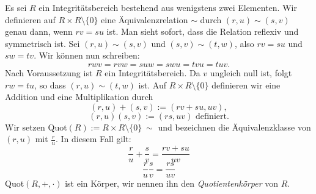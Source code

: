 \begin{satz}\label{quotkoerper} %
Es sei $R$ ein Integritätsbereich bestehend aus wenigstens zwei Elementen. Wir definieren auf $R\times R\setminus\lbrace 0\rbrace$ eine Äquivalenzrelation $\sim$ durch $\left(r,u\right) \sim \left(s, v\right)$ genau dann, wenn $rv = su$ ist. Man sieht sofort, dass die Relation reflexiv und symmetrisch ist. Sei $\left(r,u\right) \sim \left(s, v\right)$ und $ \left(s, v\right) \sim \left(t, w\right) $, also $rv = su$ und $sw = tv$. Wir können nun schreiben: \\
\[rwv = rvw = suw = swu = tvu = tuv.\]
Nach Voraussetzung ist $R$ ein Integritätsbereich. Da $v$ ungleich null ist, folgt $rw = tu$, so dass $\left(r,u \right) \sim \left(t, w\right)$ ist. Auf $R\times R\setminus \lbrace 0\rbrace$ definieren wir eine Addition und eine Multiplikation durch 
\[\left(r,u\right)+ \left(s,v\right) := \left(rv + su, uv\right),\]
\[\left(r,u\right)\left(s,v\right) := \left(rs, uv\right)\text{ definiert.}\] 
Wir setzen \textup{Quot}$(R) := R\times R\setminus\lbrace 0\rbrace \ \sim$ und bezeichnen die Äquivalenzklasse von $(r,u) $ mit $\frac{r}{u}$. In diesem Fall gilt: 
\[\frac{r}{u} + \frac{s}{v} = \frac{rv + su}{uv}\]
\[\frac{r}{u}\frac{s}{v} = \frac{rs}{uv}\]
\textup{Quot}$\left(R, +, \cdot\right)$ ist ein Körper, wir nennen ihn den \textit{Quotientenkörper} von $R$.
\end{satz}
